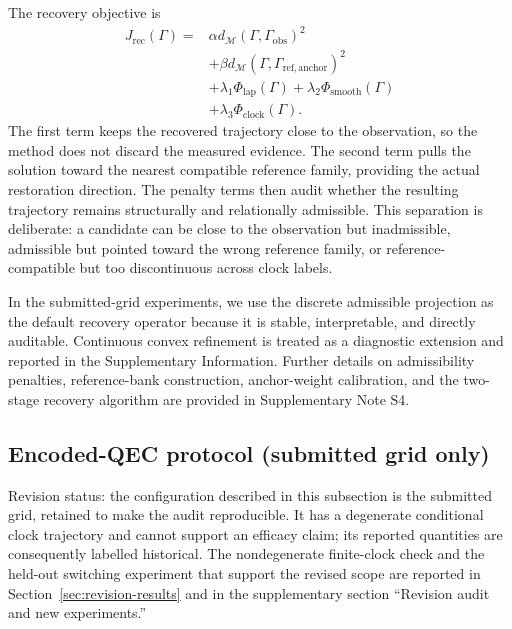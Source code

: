 \documentclass{iopjournal}
\begin{document}
The recovery objective is
\begin{equation}
\begin{aligned}
J_{\mathrm{rec}}(\Gamma)
= {}&
\alpha
d_{\mathcal{M}}\!\left(\Gamma,\Gamma_{\mathrm{obs}}\right)^2
\\
&+
\beta
d_{\mathcal{M}}\!\left(\Gamma,\Gamma_{\mathrm{ref,anchor}}\right)^2
\\
&+
\lambda_1\Phi_{\mathrm{lap}}(\Gamma)
+
\lambda_2\Phi_{\mathrm{smooth}}(\Gamma)
\\
&+
\lambda_3\Phi_{\mathrm{clock}}(\Gamma).
\end{aligned}
\label{eq:recovery-objective-main}
\end{equation}
The first term keeps the recovered trajectory close to the observation, so the
method does not discard the measured evidence. The second term pulls the solution
toward the nearest compatible reference family, providing the actual restoration
direction. The penalty terms then audit whether the resulting trajectory remains
structurally and relationally admissible. This separation is deliberate: a
candidate can be close to the observation but inadmissible, admissible but pointed
toward the wrong reference family, or reference-compatible but too discontinuous
across clock labels.

In the submitted-grid experiments, we use the discrete admissible projection as the default
recovery operator because it is stable, interpretable, and directly auditable.
Continuous convex refinement is treated as a diagnostic extension and reported in
the Supplementary Information. Further details on admissibility penalties,
reference-bank construction, anchor-weight calibration, and the two-stage recovery
algorithm are provided in Supplementary Note S4.

\subsection{Encoded-QEC protocol (submitted grid only)}\label{subsec:qec-validation}

Revision status: the configuration described in this subsection is the submitted
grid, retained to make the audit reproducible.  It has a degenerate conditional
clock trajectory and cannot support an efficacy claim; its reported quantities
are consequently labelled historical.  The nondegenerate finite-clock check and
the held-out switching experiment that support the revised scope are reported in
Section~\ref{sec:revision-results} and in the supplementary section ``Revision
audit and new experiments.''
\end{document}
